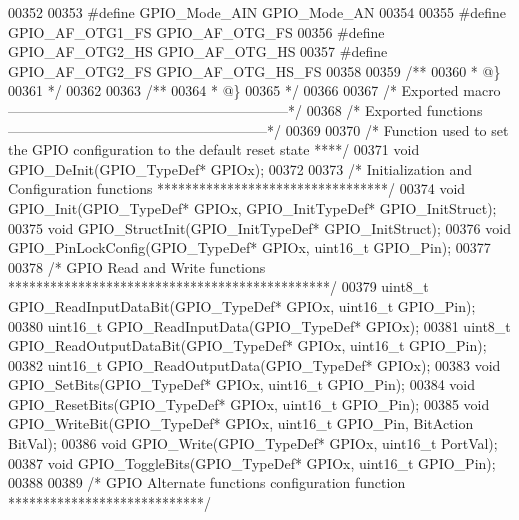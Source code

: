\begin{DoxyCode}
00352 
00353 \textcolor{preprocessor}{#}\textcolor{preprocessor}{define} \textcolor{preprocessor}{GPIO\_Mode\_AIN}           \textcolor{preprocessor}{GPIO\_Mode\_AN}
00354 
00355 \textcolor{preprocessor}{#}\textcolor{preprocessor}{define} \textcolor{preprocessor}{GPIO\_AF\_OTG1\_FS}         GPIO_AF_OTG_FS
00356 \textcolor{preprocessor}{#}\textcolor{preprocessor}{define} \textcolor{preprocessor}{GPIO\_AF\_OTG2\_HS}         GPIO_AF_OTG_HS
00357 \textcolor{preprocessor}{#}\textcolor{preprocessor}{define} \textcolor{preprocessor}{GPIO\_AF\_OTG2\_FS}         GPIO_AF_OTG_HS_FS
00358 
00359 \textcolor{comment}{/**}
00360 \textcolor{comment}{  * @\}}
00361 \textcolor{comment}{  */}
00362 
00363 \textcolor{comment}{/**}
00364 \textcolor{comment}{  * @\}}
00365 \textcolor{comment}{  */}
00366 
00367 \textcolor{comment}{/* Exported macro ------------------------------------------------------------*/}
00368 \textcolor{comment}{/* Exported functions --------------------------------------------------------*/}
00369 
00370 \textcolor{comment}{/*  Function used to set the GPIO configuration to the default reset state ****/}
00371 \textcolor{keywordtype}{void} GPIO_DeInit(GPIO\_TypeDef* GPIOx);
00372 
00373 \textcolor{comment}{/* Initialization and Configuration functions *********************************/}
00374 \textcolor{keywordtype}{void} GPIO_Init(GPIO\_TypeDef* GPIOx, GPIO\_InitTypeDef* GPIO\_InitStruct);
00375 \textcolor{keywordtype}{void} GPIO_StructInit(GPIO\_InitTypeDef* GPIO\_InitStruct);
00376 \textcolor{keywordtype}{void} GPIO_PinLockConfig(GPIO\_TypeDef* GPIOx, uint16\_t GPIO\_Pin);
00377 
00378 \textcolor{comment}{/* GPIO Read and Write functions **********************************************/}
00379 uint8\_t GPIO_ReadInputDataBit(GPIO\_TypeDef* GPIOx, uint16\_t GPIO\_Pin);
00380 uint16\_t GPIO_ReadInputData(GPIO\_TypeDef* GPIOx);
00381 uint8\_t GPIO_ReadOutputDataBit(GPIO\_TypeDef* GPIOx, uint16\_t GPIO\_Pin);
00382 uint16\_t GPIO_ReadOutputData(GPIO\_TypeDef* GPIOx);
00383 \textcolor{keywordtype}{void} GPIO_SetBits(GPIO\_TypeDef* GPIOx, uint16\_t GPIO\_Pin);
00384 \textcolor{keywordtype}{void} GPIO_ResetBits(GPIO\_TypeDef* GPIOx, uint16\_t GPIO\_Pin);
00385 \textcolor{keywordtype}{void} GPIO_WriteBit(GPIO\_TypeDef* GPIOx, uint16\_t GPIO\_Pin, BitAction BitVal);
00386 \textcolor{keywordtype}{void} GPIO_Write(GPIO\_TypeDef* GPIOx, uint16\_t PortVal);
00387 \textcolor{keywordtype}{void} GPIO_ToggleBits(GPIO\_TypeDef* GPIOx, uint16\_t GPIO\_Pin);
00388 
00389 \textcolor{comment}{/* GPIO Alternate functions configuration function ****************************/}

\end{DoxyCode}

